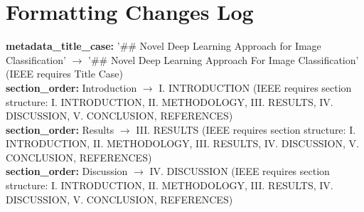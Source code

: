 \documentclass[11pt]{article}
\begin{document}
\section*{Formatting Changes Log}
\textbf{metadata_title_case:} '## Novel Deep Learning Approach for Image Classification' $\rightarrow$ '## Novel Deep Learning Approach For Image Classification' (IEEE requires Title Case) \\
\textbf{section_order:} Introduction $\rightarrow$ I. INTRODUCTION (IEEE requires section structure: I. INTRODUCTION, II. METHODOLOGY, III. RESULTS, IV. DISCUSSION, V. CONCLUSION, REFERENCES) \\
\textbf{section_order:} Results $\rightarrow$ III. RESULTS (IEEE requires section structure: I. INTRODUCTION, II. METHODOLOGY, III. RESULTS, IV. DISCUSSION, V. CONCLUSION, REFERENCES) \\
\textbf{section_order:} Discussion $\rightarrow$ IV. DISCUSSION (IEEE requires section structure: I. INTRODUCTION, II. METHODOLOGY, III. RESULTS, IV. DISCUSSION, V. CONCLUSION, REFERENCES) \\
\end{document}
